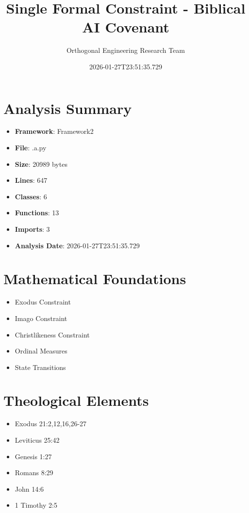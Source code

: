 ﻿\documentclass[12pt]{article}
\title{Single Formal Constraint - Biblical AI Covenant}
\author{Orthogonal Engineering Research Team}
\date{2026-01-27T23:51:35.729}
\begin{document}
\maketitle

\section{Analysis Summary}

\begin{itemize}
    \item \textbf{Framework}: Framework2
    \item \textbf{File}: .\2a.py
    \item \textbf{Size}: 20989 bytes
    \item \textbf{Lines}: 647
    \item \textbf{Classes}: 6
    \item \textbf{Functions}: 13
    \item \textbf{Imports}: 3
    \item \textbf{Analysis Date}: 2026-01-27T23:51:35.729
\end{itemize}

\section{Mathematical Foundations}

\begin{itemize}    \item Exodus Constraint
    \item Imago Constraint
    \item Christlikeness Constraint
    \item Ordinal Measures
    \item State Transitions
\end{itemize}

\section{Theological Elements}

\begin{itemize}    \item Exodus 21:2,12,16,26-27
    \item Leviticus 25:42
    \item Genesis 1:27
    \item Romans 8:29
    \item John 14:6
    \item 1 Timothy 2:5
\end{itemize}
\end{document}
